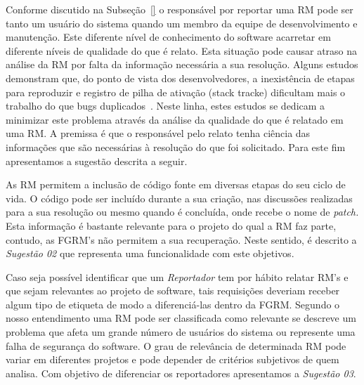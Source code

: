 Conforme discutido na Subseção~\ref{} o responsável por reportar uma RM pode ser
tanto um usuário do sistema quando um membro da equipe de desenvolvimento e
manutenção. Este diferente nível de conhecimento do software acarretar em
diferente níveis de qualidade do que é relato. Esta situação pode causar atraso
na análise da RM por falta da informação necessária a sua resolução. Alguns
estudos demonstram que, do ponto de vista dos desenvolvedores, a inexistência de
etapas para reproduzir e registro de pilha de ativação (stack tracke) dificultam
mais o trabalho do que bugs duplicados~\cite{bettenburg2008makes,
	bettenburg2007quality}. Neste linha, estes estudos se dedicam a minimizar
este problema através da análise da qualidade do que é relatado em uma RM\@. A
premissa é que o responsável pelo relato tenha ciência das informações que são
necessárias à resolução do que foi solicitado.  Para este fim apresentamos a
sugestão descrita a seguir.


As RM permitem a inclusão de código fonte em diversas etapas do seu ciclo de
vida. O código pode ser incluído durante a sua criação, nas discussões
realizadas para a sua resolução ou mesmo quando é concluída, onde recebe o nome
de \textit{patch.} Esta informação é bastante relevante para o projeto do qual a
RM faz parte, contudo, as FGRM's não permitem a sua recuperação. Neste sentido,
é descrito a \textit{Sugestão 02} que representa uma funcionalidade com este
objetivos.


Caso seja possível identificar que um \textit{Reportador} tem por hábito relatar
RM's e que sejam relevantes ao projeto de software, tais requisições deveriam
receber algum tipo de etiqueta de modo a diferenciá-las dentro da FGRM\@.
Segundo o nosso entendimento uma RM pode ser classificada como relevante se
descreve um problema que afeta um grande número de usuários do sistema ou
represente uma falha de segurança do software. O grau de relevância de
determinada RM pode variar em diferentes projetos e pode depender de critérios
subjetivos de quem analisa. Com objetivo de diferenciar os reportadores
apresentamos a \textit{Sugestão 03}.


